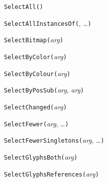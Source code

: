 \texttt{SelectAll(}\texttt{)}



\texttt{SelectAllInstancesOf(}, \ldots\texttt{)}



\texttt{SelectBitmap(}\textit{arg}\texttt{)}



\texttt{SelectByColor(}\textit{arg}\texttt{)}



\texttt{SelectByColour(}\textit{arg}\texttt{)}



\texttt{SelectByPosSub(}\textit{arg}, \textit{arg}\texttt{)}



\texttt{SelectChanged(}\textit{arg}\texttt{)}



\texttt{SelectFewer(}\textit{arg}, \ldots\texttt{)}



\texttt{SelectFewerSingletons(}\textit{arg}, \ldots\texttt{)}



\texttt{SelectGlyphsBoth(}\textit{arg}\texttt{)}



\texttt{SelectGlyphsReferences(}\textit{arg}\texttt{)}



